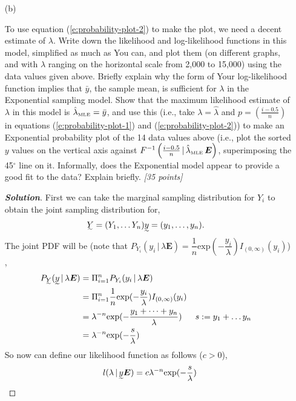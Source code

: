 \documentclass[12pt]{article}
\newcommand{\given}{\, | \,}
\newenvironment{solution}{\begin{proof}[\textbf{\textit{Solution}}] }{\end{proof}}
\begin{document}
\begin{itemize}
\begin{itemize}
\begin{itemize}
\newpage
\item[(b)] 

To use equation (\ref{e:probability-plot-2}) to make the plot, we need a decent estimate of $\lambda$. Write down the likelihood and log-likelihood functions in this model, simplified as much as You can, and plot them (on different graphs, and with $\lambda$ ranging on the horizontal scale from 2,000 to 15,000) using the data values given above. Briefly explain why the form of Your log-likelihood function implies that $\bar{ y }$, the sample mean, is sufficient for $\lambda$ in the Exponential sampling model. Show that the maximum likelihood estimate of $\lambda$ in this model is $\hat{ \lambda }_{\mbox{\tiny MLE}} = \bar{ y }$, and use this (i.e., take $\lambda = \hat{ \lambda }$ and $p = \left( \frac{ i - 0.5 }{ n } \right)$ in equations (\ref{e:probability-plot-1}) and (\ref{e:probability-plot-2})) to make an Exponential probability plot of the 14 data values above (i.e., plot the sorted $y$ values on the vertical axis against $F^{ -1 } \left( \frac{ i - 0.5 }{ n } \given \hat{ \lambda }_{\mbox{\tiny MLE}} \, \bm{ E } \right)$, superimposing the 45$^\circ$ line on it. Informally, does the Exponential model appear to provide a good fit to the data? Explain briefly. \textit{[35 points]} 

\begin{tcolorbox}[breakable]
    \begin{solution}
        First we can take the marginal sampling distribution for $Y_i$ to obtain the joint sampling distribution for,
        \begin{align*}
            \undertilde{Y} = (Y_1, \dots Y_n) & \undertilde{y} = (y_1, \dots , y_n).
        \end{align*}
        The joint PDF will be (note that $P_{Y_i}(y_i \given \lambda \bm{E}) = \dfrac{1}{n}\text{exp}(-\dfrac{y_i}{\lambda})I_{(0,\infty)}(y_i)$) ,
        \begin{align*}
            P_{\undertilde{Y}} ( \undertilde{y} \given \lambda \bm{E}) &= \Pi_{i=1}^{n} P_{Y_i}(y_i \given \lambda \bm{E} ) \\
            &= \Pi_{i=1}^{n} \frac{1}{n}\text{exp}(-\frac{y_i}{\lambda})I_{(0,\infty)}(y_i) \\
            &= \lambda^{-n}\text{exp}(-\frac{y_1 + \dots + y_n}{\lambda}) && s:= y_1 + \dots y_n \\
            &= \lambda^{-n}\text{exp}(-\frac{s}{\lambda})
        \end{align*}
        So now can define our likelihood function as follows ($c> 0$),
        \[l(\lambda \given \undertilde{y}\bm{E}) = c\lambda^{-n}\text{exp}(-\frac{s}{\lambda})\]


\end{solution}
\end{tcolorbox}
\end{itemize}
\end{itemize}
\end{itemize}
\end{document}
